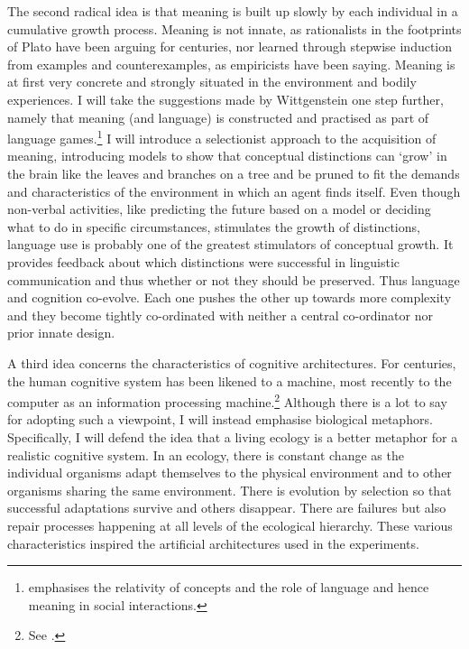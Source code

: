 The second radical idea is that 
meaning is built up slowly by each individual in a cumulative
growth process. Meaning is not innate, as rationalists in the 
footprints of Plato have been arguing for centuries, nor 
learned through stepwise
induction from examples and counterexamples, as empiricists
have been saying. Meaning is at first very concrete and
strongly situated in the environment and bodily experiences.
I will take the suggestions made
by Wittgenstein  one step further, namely that meaning (and language) is constructed
and practised as part of
language games.\footnote{\cite{Wittgenstein:1953} emphasises the relativity 
of concepts and the role of language and hence
meaning in social interactions.}
I will introduce a selectionist approach to
the acquisition of meaning, introducing models to 
show that conceptual distinctions can `grow' in the brain
like the leaves and branches on a tree and be pruned to fit the
demands and characteristics of the environment in which
an agent finds itself. Even though non-verbal 
activities, like predicting the future based on a model 
or deciding what to do in specific circumstances, stimulates
the growth of distinctions, language use is probably one 
of the greatest stimulators of conceptual growth. It provides
feedback about which distinctions were successful in linguistic
communication and thus whether or not they should be preserved. 
Thus language and cognition co-evolve. Each one pushes the other 
up towards more complexity and they become tightly 
co-ordinated with neither a central co-ordinator nor prior innate design. 

A third idea concerns the characteristics of
cognitive architectures.
For centuries, the human cognitive system has been 
likened to a machine, most recently to the computer as 
an information processing machine.\footnote{See \cite{Newell:1976}.}
Although there is a lot to say for adopting such a 
viewpoint, I will instead emphasise biological metaphors. 
Specifically, I will defend the idea that a living ecology 
is a better metaphor for a realistic cognitive system. 
In an ecology, there is constant change as 
the individual organisms adapt themselves to the 
physical environment and to other organisms sharing 
the same environment. There is evolution by selection so 
that successful adaptations survive and others disappear. 
There are failures but also repair processes 
happening at all levels of the ecological 
hierarchy. These various characteristics inspired
the artificial architectures used in 
the experiments. 

